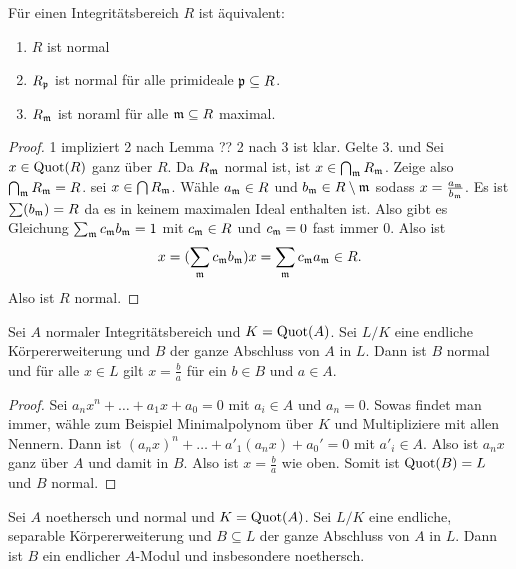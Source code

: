 \begin{Satz}\label{Satz:NormalIntegrit}
	Für einen Integritätsbereich \(R\) ist äquivalent:
	\begin{enumerate}
		\item \(R\) ist normal
		\item \(R_{\mathfrak{p}}\) ist normal für alle primideale \(\mathfrak{p}\subseteq R\).
		\item \(R_{\mathfrak{m}}\) ist noraml für alle \(\mathfrak{m}\subseteq R\) maximal.
	\end{enumerate}
\end{Satz}
\begin{proof}
	1 impliziert 2 nach Lemma ??
	2 nach 3 ist klar.
	Gelte 3. und Sei \(x\in\operatorname{Quot}(R)\) ganz über \(R\). Da \(R_{\mathfrak{m}}\) normal ist, ist \(x\in\bigcap_{\mathfrak{m}} R_{\mathfrak{m}}\). Zeige also \(\bigcap_{\mathfrak{m}} R_{\mathfrak{m}}=R\).
	sei \(x\in \bigcap R_{\mathfrak{m}}\).
	Wähle \(a_{\mathfrak{m}}\in R\) und \(b_{\mathfrak{m}} \in R\setminus\mathfrak{m}\) sodass \(x=\frac{a_{\mathfrak{m}}}{b_{\mathfrak{m}}}\). Es ist \(\sum(b_{\mathfrak{m}})=R\) da es in keinem maximalen Ideal enthalten ist. Also gibt es Gleichung \(\sum_{\mathfrak{m}} c_{\mathfrak{m}} b_{\mathfrak{m}}=1\) mit \(c_{\mathfrak{m}}\in R\) und \(c_{\mathfrak{m}}=0\) fast immer \(0\).
	Also ist \[x=(\sum_{\mathfrak{m}} c_{\mathfrak{m}} b_{\mathfrak{m}})x=\sum_{\mathfrak{m}} c_{\mathfrak{m}} a_{\mathfrak{m}}\in R.\] Also ist \(R\) normal.
\end{proof}
\begin{Lemma}
	Sei \(A\) normaler Integritätsbereich und \(K=\operatorname{Quot}(A)\). Sei \(L/K\) eine endliche Körpererweiterung 
	und \(B\) der ganze Abschluss von \(A\) in \(L\).
	Dann ist \(B\) normal und für alle \(x\in L\) gilt \(x=\frac b a\) für ein \(b\in B\) und 
	\(a\in A\).
\end{Lemma}
\begin{proof}
	Sei \(a_nx^n+\dots+a_1x+a_0=0\) mit \(a_i\in A\) und \(a_n=0\). Sowas findet man immer,
	wähle zum Beispiel Minimalpolynom über \(K\) und Multipliziere mit allen Nennern.
	Dann ist \((a_nx)^n+\dots+a'_1(a_nx)+a_0'=0\) mit \(a'_i\in A\).
	Also ist \(a_nx\) ganz über \(A\) und damit in \(B\).
	Also ist \(x=\frac b a\) wie oben.
	Somit ist \(\operatorname{Quot}(B)=L\) und \(B\) normal.
\end{proof}
\begin{Satz}
	Sei \(A\) noethersch und normal und \(K=\operatorname{Quot}(A)\). Sei \(L/K\) eine endliche, separable Körpererweiterung
	und \(B\subseteq L\) der ganze Abschluss von \(A\) in \(L\).
	Dann ist \(B\) ein endlicher \(A\)-Modul und insbesondere noethersch.
\end{Satz}
